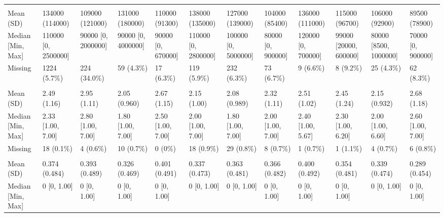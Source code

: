 \documentclass[
  single column]{article}
\begin{document}
\begin{landscape}
\begin{longtable}[t]{llllllllllll}
\addlinespace[0.3em]
\multicolumn{12}{l}{\textbf{Household Income}}\\
\hspace{1em}Mean (SD) & 134000 (114000) & 109000 (121000) & 131000 (180000) & 110000 (91300) & 138000 (135000) & 127000 (139000) & 104000 (85400) & 136000 (111000) & 115000 (96700) & 106000 (92900) & 89500 (78900)\\
\hspace{1em}Median [Min, Max] & 110000 [0, 2500000] & 90000 [0, 2000000] & 90000 [0, 4000000] & 90000 [0, 670000] & 110000 [0, 2800000] & 100000 [0, 5000000] & 80000 [0, 900000] & 120000 [0, 700000] & 99000 [20000, 600000] & 80000 [8500, 1000000] & 70000 [0, 900000]\\
\hspace{1em}Missing & 1224 (5.7\%) & 224 (34.0\%) & 59 (4.3\%) & 17 (6.3\%) & 119 (5.9\%) & 232 (6.3\%) & 73 (6.7\%) & 9 (6.6\%) & 8 (9.2\%) & 25 (4.3\%) & 62 (8.3\%)\\
\addlinespace[0.3em]
\multicolumn{12}{l}{\textbf{Left-Wing Authoritarianism}}\\
\hspace{1em}Mean (SD) & 2.49 (1.16) & 2.95 (1.11) & 2.05 (0.960) & 2.67 (1.15) & 2.15 (1.00) & 2.08 (0.989) & 2.32 (1.11) & 2.51 (1.02) & 2.45 (1.24) & 2.15 (0.932) & 2.68 (1.18)\\
\hspace{1em}Median [Min, Max] & 2.33 [1.00, 7.00] & 2.80 [1.00, 7.00] & 1.80 [1.00, 7.00] & 2.50 [1.00, 7.00] & 2.00 [1.00, 7.00] & 1.80 [1.00, 7.00] & 2.00 [1.00, 7.00] & 2.40 [1.00, 5.67] & 2.30 [1.00, 6.20] & 2.00 [1.00, 6.60] & 2.60 [1.00, 7.00]\\
\hspace{1em}Missing & 18 (0.1\%) & 4 (0.6\%) & 10 (0.7\%) & 0 (0\%) & 18 (0.9\%) & 29 (0.8\%) & 8 (0.7\%) & 1 (0.7\%) & 1 (1.1\%) & 4 (0.7\%) & 6 (0.8\%)\\
\addlinespace[0.3em]
\multicolumn{12}{l}{\textbf{Male (Yes/No)}}\\
\hspace{1em}Mean (SD) & 0.374 (0.484) & 0.393 (0.489) & 0.326 (0.469) & 0.401 (0.491) & 0.337 (0.473) & 0.363 (0.481) & 0.366 (0.482) & 0.400 (0.492) & 0.354 (0.481) & 0.339 (0.474) & 0.289 (0.454)\\
\hspace{1em}Median [Min, Max] & 0 [0, 1.00] & 0 [0, 1.00] & 0 [0, 1.00] & 0 [0, 1.00] & 0 [0, 1.00] & 0 [0, 1.00] & 0 [0, 1.00] & 0 [0, 1.00] & 0 [0, 1.00] & 0 [0, 1.00] & 0 [0, \vphantom{1} 1.00]\\

\end{longtable}
\end{landscape}
\end{document}

